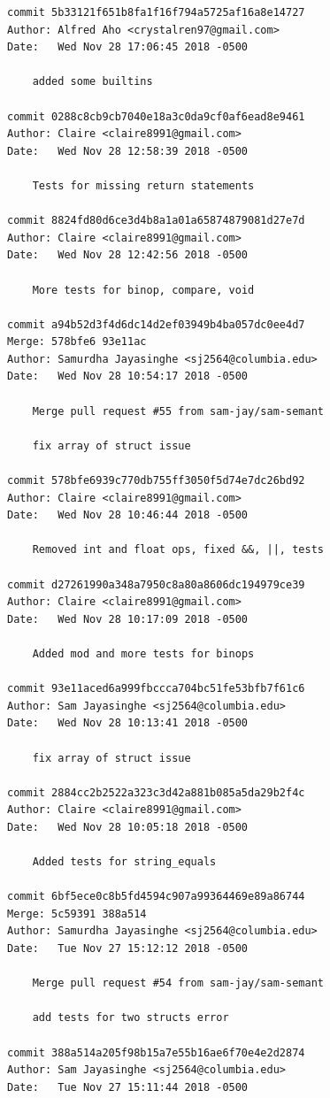 \documentclass[12pt]{article}
\begin{document}
\begin{lstlisting}
commit 5b33121f651b8fa1f16f794a5725af16a8e14727
Author: Alfred Aho <crystalren97@gmail.com>
Date:   Wed Nov 28 17:06:45 2018 -0500

    added some builtins

commit 0288c8cb9cb7040e18a3c0da9cf0af6ead8e9461
Author: Claire <claire8991@gmail.com>
Date:   Wed Nov 28 12:58:39 2018 -0500

    Tests for missing return statements

commit 8824fd80d6ce3d4b8a1a01a65874879081d27e7d
Author: Claire <claire8991@gmail.com>
Date:   Wed Nov 28 12:42:56 2018 -0500

    More tests for binop, compare, void

commit a94b52d3f4d6dc14d2ef03949b4ba057dc0ee4d7
Merge: 578bfe6 93e11ac
Author: Samurdha Jayasinghe <sj2564@columbia.edu>
Date:   Wed Nov 28 10:54:17 2018 -0500

    Merge pull request #55 from sam-jay/sam-semant
    
    fix array of struct issue

commit 578bfe6939c770db755ff3050f5d74e7dc26bd92
Author: Claire <claire8991@gmail.com>
Date:   Wed Nov 28 10:46:44 2018 -0500

    Removed int and float ops, fixed &&, ||, tests

commit d27261990a348a7950c8a80a8606dc194979ce39
Author: Claire <claire8991@gmail.com>
Date:   Wed Nov 28 10:17:09 2018 -0500

    Added mod and more tests for binops

commit 93e11aced6a999fbccca704bc51fe53bfb7f61c6
Author: Sam Jayasinghe <sj2564@columbia.edu>
Date:   Wed Nov 28 10:13:41 2018 -0500

    fix array of struct issue

commit 2884cc2b2522a323c3d42a881b085a5da29b2f4c
Author: Claire <claire8991@gmail.com>
Date:   Wed Nov 28 10:05:18 2018 -0500

    Added tests for string_equals

commit 6bf5ece0c8b5fd4594c907a99364469e89a86744
Merge: 5c59391 388a514
Author: Samurdha Jayasinghe <sj2564@columbia.edu>
Date:   Tue Nov 27 15:12:12 2018 -0500

    Merge pull request #54 from sam-jay/sam-semant
    
    add tests for two structs error

commit 388a514a205f98b15a7e55b16ae6f70e4e2d2874
Author: Sam Jayasinghe <sj2564@columbia.edu>
Date:   Tue Nov 27 15:11:44 2018 -0500


\end{lstlisting}
\end{document}
